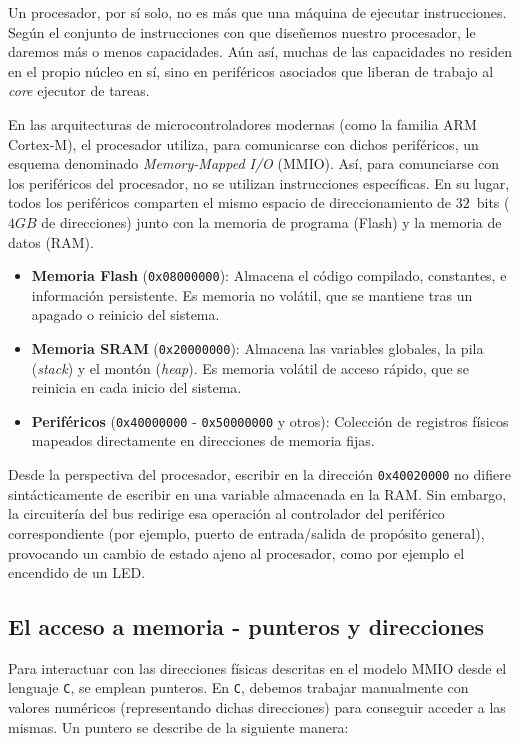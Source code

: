 \documentclass[../main.tex]{subfiles}
\begin{document}
        Un procesador, por sí solo, no es más que una máquina de ejecutar instrucciones. Según el conjunto de instrucciones con que diseñemos nuestro procesador, le daremos más o menos capacidades. Aún así, muchas de las capacidades no residen en el propio núcleo en sí, sino en periféricos asociados que liberan de trabajo al \emph{core} ejecutor de tareas. 

        En las arquitecturas de microcontroladores modernas (como la familia ARM Cortex-M), el procesador utiliza, para comunicarse con dichos periféricos, un esquema denominado \emph{Memory-Mapped I/O} (MMIO). Así, para comunciarse con los periféricos del procesador, no se utilizan instrucciones específicas. En su lugar, todos los periféricos comparten el mismo espacio de direccionamiento de $32$~bits ($4GB$ de direcciones) junto con la memoria de programa (Flash) y la memoria de datos (RAM).

        \begin{itemize}
            \item \textbf{Memoria Flash} (\texttt{0x08000000}): Almacena el código compilado, constantes, e información persistente. Es memoria no volátil, que se mantiene tras un apagado o reinicio del sistema.
            \item \textbf{Memoria SRAM} (\texttt{0x20000000}): Almacena las variables globales, la pila (\emph{stack}) y el montón (\emph{heap}). Es memoria volátil de acceso rápido, que se reinicia en cada inicio del sistema.
            \item \textbf{Periféricos} (\texttt{0x40000000} - \texttt{0x50000000} y otros): Colección de registros físicos mapeados directamente en direcciones de memoria fijas.
        \end{itemize}

        Desde la perspectiva del procesador, escribir en la dirección \texttt{0x40020000} no difiere sintácticamente de escribir en una variable almacenada en la RAM. Sin embargo, la circuitería del bus redirige esa operación al controlador del periférico correspondiente (por ejemplo, puerto de entrada/salida de propósito general), provocando un cambio de estado ajeno al procesador, como por ejemplo el encendido de un LED.

    \subsection{El acceso a memoria - punteros y direcciones}

        Para interactuar con las direcciones físicas descritas en el modelo MMIO desde el lenguaje \texttt{C}, se emplean punteros. En \texttt{C}, debemos trabajar manualmente con valores numéricos (representando dichas direcciones) para conseguir acceder a las mismas. Un puntero se describe de la siguiente manera:
\end{document}
